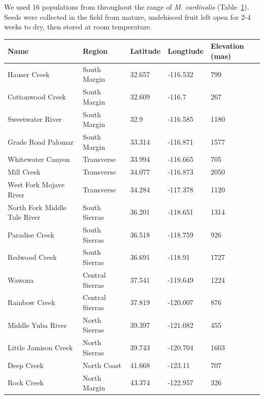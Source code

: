 \documentclass[11pt, oneside]{article}
\begin{document}
We used 16 populations from throughout the range of \textit{M. cardinalis} (Table~\ref{table:Table_FocalPops}). Seeds were collected in the field from mature, undehisced fruit left open for 2-4 weeks to dry, then stored at room temperature.



\begin{table}[ht]
   \centering
   \begin{tabular}{@{} lllll @{}}
      \toprule
  Name& Region  & Latitude  & Longtiude  & Elevation (mas) \\
      \midrule
	Hauser Creek & South Margin & 32.657	& 
    -116.532	& 799   \\
	Cottonwood Creek	& South Margin & 32.609 & 
    -116.7	& 267   \\
	Sweetwater River	& South Margin & 32.9 & 
    -116.585	& 1180   \\
	Grade Road Palomar & South Margin & 33.314 &
    -116.871	& 1577   \\
	Whitewater Canyon &	Transverse & 33.994 & 
    -116.665	& 705   \\
	Mill Creek	& Transverse & 34.077 & 
    -116.873	& 2050   \\
	West Fork Mojave River	& Transverse & 34.284 & 
    -117.378	& 1120   \\
	North Fork Middle Tule River	& South Sierras & 36.201 & 
    -118.651	& 1314   \\
	Paradise Creek	& South Sierras & 36.518 & 
    -118.759	& 926   \\
	Redwood Creek	& South Sierras & 36.691 & 
    -118.91	& 1727   \\
	Wawona  & Central Sierras & 37.541 & 
    -119.649	& 1224   \\
	Rainbow Creek	& Central Sierras	& 37.819 & 
    -120.007	& 876   \\
	Middle Yuba River	& North Sierras	& 39.397 & 
    -121.082	& 455   \\
	Little Jamison Creek	& North Sierras	& 39.743 & 
    -120.704	& 1603   \\
	Deep Creek	& North Coast & 41.668 & 
    -123.11	& 707   \\
	Rock Creek	& North Margin & 43.374 & 
    -122.957	& 326   \\
	\bottomrule
	\end{tabular}
	\label{table:Table_FocalPops}
\end{table}
\end{document}
